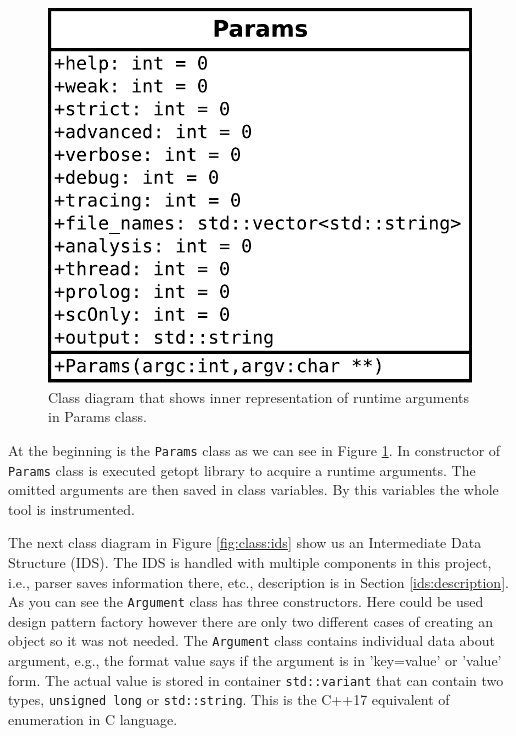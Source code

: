 \begin{figure}[h]
	\centering
	\includegraphics[width=0.4\linewidth]{obrazky-figures/class/params.pdf}
	\caption{Class diagram that shows inner representation of runtime arguments
	in Params class.}
	\label{fig:class:params}
\end{figure}

At the beginning is the \texttt{Params} class as we can see in Figure
\ref{fig:class:params}. In constructor of \texttt{Params} class is executed
getopt library to acquire a runtime arguments. The omitted arguments are then
saved in class variables. By this variables the whole tool is instrumented.

The next class diagram in Figure \ref{fig:class:ids} show us an Intermediate
Data Structure (IDS). The IDS is handled with multiple components in this
project, i.e., parser saves information there, etc., description is in Section
\ref{ids:description}. As you can see the \texttt{Argument} class has three
constructors.  Here could be used design pattern factory however there are only
two different cases of creating an object so it was not needed. The
\texttt{Argument} class contains individual data about argument, e.g., the
format value says if the argument is in 'key=value' or 'value' form. The actual
value is stored in container \texttt{std::variant} that can contain two types,
\texttt{unsigned long} or \texttt{std::string}. This is the C++17 equivalent of
enumeration in C language.

